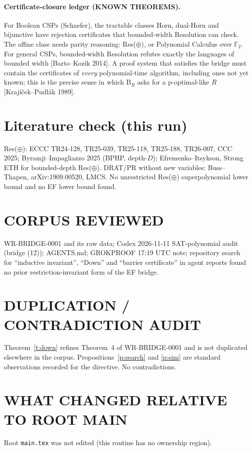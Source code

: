 \documentclass[11pt]{article}
\begin{document}
\paragraph{Certificate-closure ledger (KNOWN THEOREMS).}
For Boolean CSPs (Schaefer), the tractable classes Horn, dual-Horn and
bijunctive have rejection certificates that bounded-width Resolution can
check. The affine class needs parity reasoning: Res($\oplus$), or Polynomial
Calculus over $\mathbb F_2$. For general CSPs, bounded-width Resolution
refutes exactly the languages of bounded width [Barto--Kozik 2014]. A proof
system that satisfies the bridge must contain the certificates of
\emph{every} polynomial-time algorithm, including ones not yet known; this
is the precise sense in which $\mathrm B_R$ asks for a p-optimal-like $R$
[Krajíček--Pudlák 1989].

\section*{Literature check (this run)}
Res($\oplus$): ECCC TR24-128, TR25-039, TR25-118, TR25-188, TR26-007, CCC 2025;
Byramji--Impagliazzo 2025 (BPHP, depth-$D$); Efremenko--Itsykson, Strong ETH for
bounded-depth Res($\oplus$). DRAT/PR without new variables: Buss--Thapen,
arXiv:1909.00520, LMCS. No unrestricted Res($\oplus$) superpolynomial lower bound
and no EF lower bound found.

\section*{CORPUS REVIEWED}
WR-BRIDGE-0001 and its raw data; Codex 2026-11-11 SAT-polynomial audit
(bridge (12)); AGENTS.md; GROKPROOF 17:19 UTC note; repository search for
``inductive invariant'', ``Down'' and ``barrier certificate'' in agent reports
found no prior restriction-invariant form of the EF bridge.

\section*{DUPLICATION / CONTRADICTION AUDIT}
Theorem~\ref{t:down} refines Theorem~4 of WR-BRIDGE-0001 and is not
duplicated elsewhere in the corpus. Propositions~\ref{p:search} and \ref{p:sim}
are standard observations recorded for the directive. No contradictions.

\section*{WHAT CHANGED RELATIVE TO ROOT MAIN}
Root \texttt{main.tex} was not edited (this routine has no ownership region).
\end{document}
